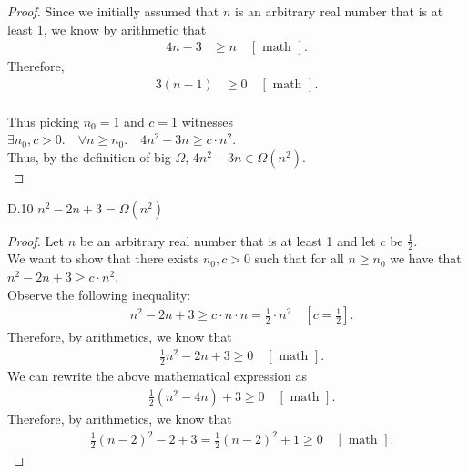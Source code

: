 \documentclass[10pt]{article}
\begin{document}
\begin{enumerate}[label={}]
\begin{proof}
              Since we initially assumed that $n$ is an arbitrary real number that is at least 1, we know by arithmetic that
              $$
                  \begin{aligned}
                      4 n-3 & \geq n \quad[\text { math }].
                  \end{aligned}
              $$
              Therefore,
              $$
                  \begin{aligned}
                      3 (n-1) & \geq 0 \quad[\text { math }]. \\
                  \end{aligned}
              $$

              Thus picking $n_0=1$ and $c=1$ witnesses \\$\exists n_0, c>0 .\quad \forall n \geq n_0 .\quad 4 n^2-3 n \geq c \cdot n^2$.\\
                  Thus, by the definition of big-$\Omega$, $4 n^2-3 n \in \Omega\left(n^2\right)$.\\
          \end{proof}
          D.10 $n^2-2 n+3=\Omega\left(n^2\right)$
          \begin{proof}
              Let $n$ be an arbitrary real number that is at least 1 and let $c$ be $\frac{1}{2}$.\\
              We want to show that there exists $n_0, c > 0$ such that for all $n\geq n_0$ we have that $n^2-2 n+3 \geq c \cdot n^2$.\\
              Observe the following inequality:\\
              $$
                  \begin{aligned}
                       & n^2-2 n+3 \geq c \cdot n \cdot n =\frac{1}{2} \cdot n^2 \quad\left[c=\frac{1}{2}\right].
                  \end{aligned}
              $$
              Therefore, by arithmetics, we know that
              $$
                  \begin{aligned}
                       & \frac{1}{2} n^2-2 n+3 \geq 0 \quad[\text { math }].
                  \end{aligned}
              $$
              We can rewrite the above mathematical expression as
              $$
                  \begin{aligned}
                       & \frac{1}{2}\left(n^2-4 n\right)+3 \geq 0 \quad[\text { math }].
                  \end{aligned}
              $$
              Therefore, by arithmetics, we know that
              $$
                  \begin{aligned}
                       & \frac{1}{2}(n-2)^2-2+3=\frac{1}{2}(n-2)^2+1 \geq 0 \quad[\text { math }].
                  \end{aligned}
              $$


\end{proof}
\end{enumerate}
\end{document}
